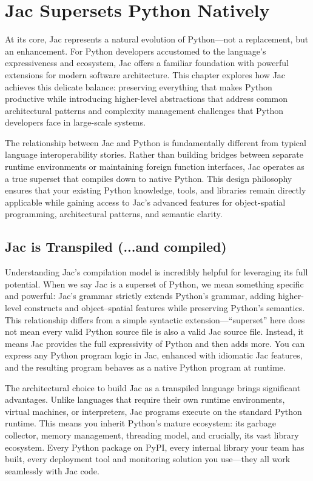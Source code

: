 \mtcaddchapter
\chapter{Jac Supersets Python Natively}
\minitoc

At its core, Jac represents a natural evolution of Python—not a replacement, but an enhancement. For Python developers accustomed to the language's expressiveness and ecosystem, Jac offers a familiar foundation with powerful extensions for modern software architecture. This chapter explores how Jac achieves this delicate balance: preserving everything that makes Python productive while introducing higher-level abstractions that address common architectural patterns and complexity management challenges that Python developers face in large-scale systems.

The relationship between Jac and Python is fundamentally different from typical language interoperability stories. Rather than building bridges between separate runtime environments or maintaining foreign function interfaces, Jac operates as a true superset that compiles down to native Python. This design philosophy ensures that your existing Python knowledge, tools, and libraries remain directly applicable while gaining access to Jac's advanced features for object-spatial programming, architectural patterns, and semantic clarity.

\section{Jac is Transpiled (...and compiled)}

Understanding Jac's compilation model is incredibly helpful for leveraging its full potential. When we say Jac is a superset of Python, we mean something specific and powerful: Jac's grammar strictly extends Python's grammar, adding higher-level constructs and object–spatial features while preserving Python's semantics. This relationship differs from a simple syntactic extension—``superset'' here does not mean every valid Python source file is also a valid Jac source file. Instead, it means Jac provides the full expressivity of Python and then adds more. You can express any Python program logic in Jac, enhanced with idiomatic Jac features, and the resulting program behaves as a native Python program at runtime.

The architectural choice to build Jac as a transpiled language brings significant advantages. Unlike languages that require their own runtime environments, virtual machines, or interpreters, Jac programs execute on the standard Python runtime. This means you inherit Python's mature ecosystem: its garbage collector, memory management, threading model, and crucially, its vast library ecosystem. Every Python package on PyPI, every internal library your team has built, every deployment tool and monitoring solution you use—they all work seamlessly with Jac code.

